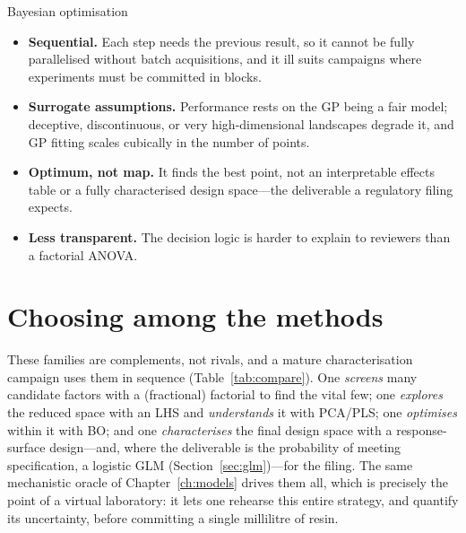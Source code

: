 \begin{consbox}{Bayesian optimisation}
\begin{itemize}
  \item \textbf{Sequential.} Each step needs the previous result, so it cannot be
  fully parallelised without batch acquisitions, and it ill suits campaigns where
  experiments must be committed in blocks.
  \item \textbf{Surrogate assumptions.} Performance rests on the GP being a fair
  model; deceptive, discontinuous, or very high-dimensional landscapes degrade
  it, and GP fitting scales cubically in the number of points.
  \item \textbf{Optimum, not map.} It finds the best point, not an interpretable
  effects table or a fully characterised design space---the deliverable a
  regulatory filing expects.
  \item \textbf{Less transparent.} The decision logic is harder to explain to
  reviewers than a factorial ANOVA.
\end{itemize}
\end{consbox}

\section{Choosing among the methods}
\label{sec:design-compare}

These families are complements, not rivals, and a mature characterisation
campaign uses them in sequence (Table~\ref{tab:compare}). One \emph{screens} many
candidate factors with a (fractional) factorial to find the vital few; one
\emph{explores} the reduced space with an LHS and \emph{understands} it with
PCA/PLS; one \emph{optimises} within it with BO; and one \emph{characterises} the
final design space with a response-surface design---and, where the deliverable is
the probability of meeting specification, a logistic GLM
(Section~\ref{sec:glm})---for the filing. The same
mechanistic oracle of Chapter~\ref{ch:models} drives them all, which is precisely
the point of a virtual laboratory: it lets one rehearse this entire strategy,
and quantify its uncertainty, before committing a single millilitre of resin.

